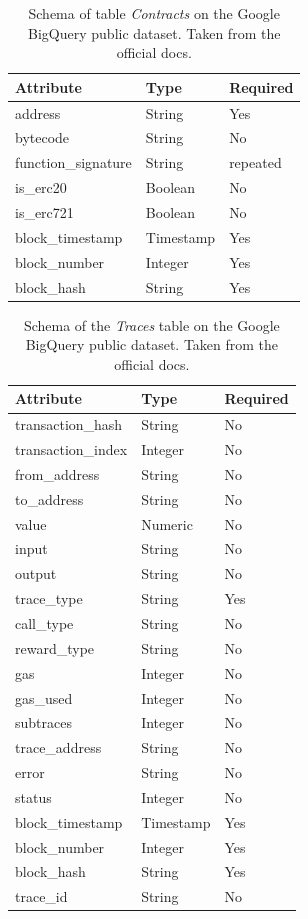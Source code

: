 \begin{table}[H]
\centering
    \begin{tabular}  { m{6cm} m{3cm} m{3cm} } 
    \toprule
    \textbf{Attribute} & \textbf{Type} & \textbf{Required} \\
    \midrule
    address & String & Yes \\
    bytecode & String & No \\
    function\_signature & String & repeated \\
    is\_erc20 & Boolean & No \\
    is\_erc721 & Boolean & No \\
    block\_timestamp & Timestamp & Yes \\
    block\_number & Integer & Yes \\
    block\_hash & String & Yes \\
    \bottomrule
\end{tabular}
\caption[Google BigQuery \texttt{Contracts} table]{Schema of table \textit{Contracts} on the Google BigQuery public dataset. Taken from the official docs.}
\label{table:bigquery-contracts}
\end{table}

\begin{table}[H]
\centering
    \begin{tabular}  { m{6cm} m{3cm} m{3cm} } 
    \toprule
    \textbf{Attribute} & \textbf{Type} & \textbf{Required} \\
    \midrule
    transaction\_hash & String &	No	\\			
    transaction\_index & Integer	& No	\\			
    from\_address & String &	No \\	
    to\_address & String & No \\				
    value & Numeric &	No		\\		
    input & String &	No		\\		
    output & String	& No		\\		
    trace\_type & String &	Yes		\\		
    call\_type & String	& No	\\
    reward\_type & String	& No\\
    gas & Integer	& No\\
    gas\_used & Integer	& No\\
    subtraces & Integer	& No\\
    trace\_address & String	& No		\\
    error & String	& No		\\
    status & Integer	& No	\\		
    block\_timestamp & Timestamp	& Yes		\\		
    block\_number & Integer	& Yes			\\	
    block\_hash & String	& Yes	\\			
    trace\_id & String	& No \\
    \bottomrule
\end{tabular}
\caption[Google BigQuery \texttt{Traces} table]{Schema of the \textit{Traces} table on the Google BigQuery public dataset. Taken from the official docs.}
\label{table:bigquery-traces}
\end{table}


